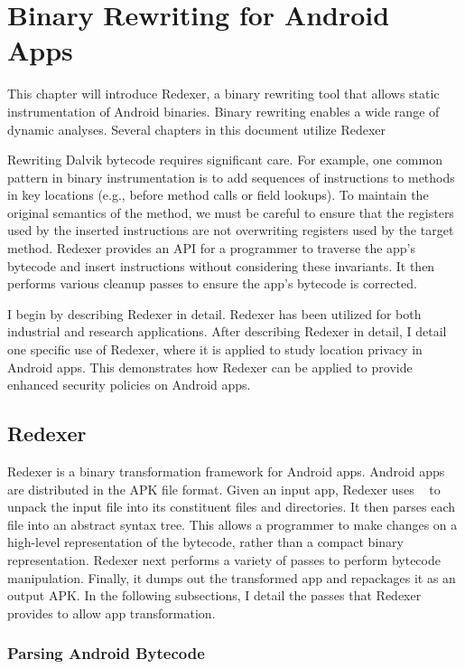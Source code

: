 \renewcommand{\thechapter}{2}

\chapter{Binary Rewriting for Android Apps}

This chapter will introduce Redexer, a binary rewriting tool that
allows static instrumentation of Android binaries. Binary rewriting
enables a wide range of dynamic analyses. Several chapters in this
document utilize Redexer

Rewriting Dalvik bytecode requires significant care. For example, one
common pattern in binary instrumentation is to add sequences of
instructions to methods in key locations (e.g., before method calls or
field lookups). To maintain the original semantics of the method, we
must be careful to ensure that the registers used by the inserted
instructions are not overwriting registers used by the target
method. Redexer provides an API for a programmer to traverse the app's
bytecode and insert instructions without considering these
invariants. It then performs various cleanup passes to ensure the
app's bytecode is corrected.

I begin by describing Redexer in detail. Redexer has been utilized for
both industrial and research applications. After describing Redexer in
detail, I detail one specific use of Redexer, where it is applied to
study location privacy in Android apps. This demonstrates how Redexer
can be applied to provide enhanced security policies on Android apps.

\section{Redexer}
Redexer is a binary transformation framework for Android apps. Android
apps are distributed in the APK file format. Given an input app,
Redexer uses ~\cite{apktool} to unpack the input file
into its constituent files and directories. It then parses each
 file into an abstract syntax tree. This allows a
programmer to make changes on a high-level representation of the
bytecode, rather than a compact binary representation. Redexer next
performs a variety of passes to perform bytecode
manipulation. Finally, it dumps out the transformed app and repackages
it as an output APK. In the following subsections, I detail the passes
that Redexer provides to allow app transformation.

\subsection{Parsing Android Bytecode}

